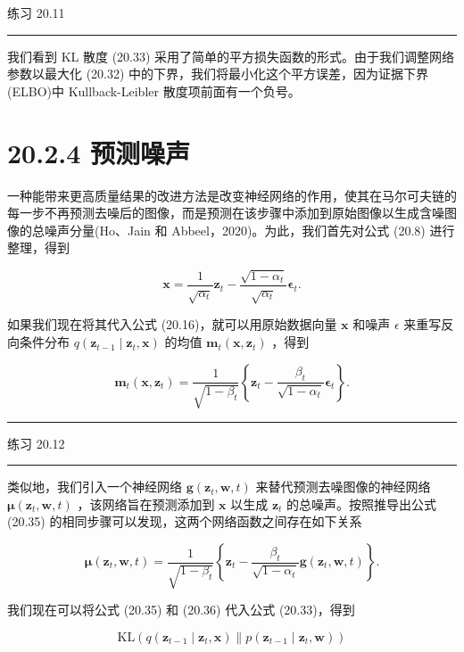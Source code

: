 \documentclass[10pt]{article}
\newcommand{\HRule}{\begin{center}\rule{0.9\linewidth}{0.2mm}\end{center}}
\begin{document}
练习 20.11

\HRule

我们看到 KL 散度 (20.33) 采用了简单的平方损失函数的形式。由于我们调整网络参数以最大化 (20.32) 中的下界，我们将最小化这个平方误差，因为证据下界(ELBO)中 Kullback-Leibler 散度项前面有一个负号。

\section*{20.2.4 预测噪声}

一种能带来更高质量结果的改进方法是改变神经网络的作用，使其在马尔可夫链的每一步不再预测去噪后的图像，而是预测在该步骤中添加到原始图像以生成含噪图像的总噪声分量(Ho、Jain 和 Abbeel，2020)。为此，我们首先对公式 (20.8) 进行整理，得到

\[
\mathbf{x} = \frac{1}{\sqrt{{\alpha }_{t}}}{\mathbf{z}}_{t} - \frac{\sqrt{1 - {\alpha }_{t}}}{\sqrt{{\alpha }_{t}}}{\mathbf{\epsilon }}_{t}. \tag{20.34}
\]

如果我们现在将其代入公式 (20.16)，就可以用原始数据向量 \(\mathbf{x}\) 和噪声 \(\epsilon\) 来重写反向条件分布 \(q\left( {{\mathbf{z}}_{t - 1} \mid  {\mathbf{z}}_{t},\mathbf{x}}\right)\) 的均值 \({\mathbf{m}}_{t}\left( {\mathbf{x},{\mathbf{z}}_{t}}\right)\) ，得到

\[
{\mathbf{m}}_{t}\left( {\mathbf{x},{\mathbf{z}}_{t}}\right)  = \frac{1}{\sqrt{1 - {\beta }_{t}}}\left\{  {{\mathbf{z}}_{t} - \frac{{\beta }_{t}}{\sqrt{1 - {\alpha }_{t}}}{\mathbf{\epsilon }}_{t}}\right\}  . \tag{20.35}
\]

\HRule

练习 20.12

\HRule

类似地，我们引入一个神经网络 \(\mathbf{g}\left( {{\mathbf{z}}_{t},\mathbf{w},t}\right)\) 来替代预测去噪图像的神经网络 \(\mathbf{\mu }\left( {{\mathbf{z}}_{t},\mathbf{w},t}\right)\) ，该网络旨在预测添加到 \(\mathbf{x}\) 以生成 \({\mathbf{z}}_{t}\) 的总噪声。按照推导出公式 (20.35) 的相同步骤可以发现，这两个网络函数之间存在如下关系

\[
\mathbf{\mu }\left( {{\mathbf{z}}_{t},\mathbf{w},t}\right)  = \frac{1}{\sqrt{1 - {\beta }_{t}}}\left\{  {{\mathbf{z}}_{t} - \frac{{\beta }_{t}}{\sqrt{1 - {\alpha }_{t}}}\mathbf{g}\left( {{\mathbf{z}}_{t},\mathbf{w},t}\right) }\right\}  . \tag{20.36}
\]

我们现在可以将公式 (20.35) 和 (20.36) 代入公式 (20.33)，得到

\[
\mathrm{{KL}}\left( {q\left( {{\mathbf{z}}_{t - 1} \mid  {\mathbf{z}}_{t},\mathbf{x}}\right) \parallel p\left( {{\mathbf{z}}_{t - 1} \mid  {\mathbf{z}}_{t},\mathbf{w}}\right) }\right)
\]
\end{document}
